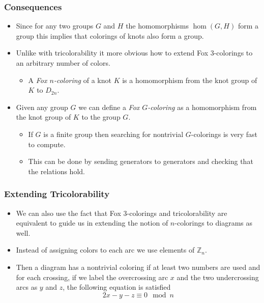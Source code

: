 \documentclass{beamer}
\begin{document}
\begin{frame}
  \frametitle{Consequences}
  \begin{itemize}
  \item Since for any two groups $G$ and $H$ the homomorphisms
    $\hom(G,H)$ form a group this implies that colorings of knots
    also form a group.
  \item Unlike with tricolorability it more obvious how to extend
    Fox $3$-colorings to an arbitrary number of colors.
    \begin{itemize}
    \item A \textit{Fox $n$-coloring} of a knot $K$ is a homomorphism from
      the knot group of $K$ to $D_{2n}$.
    \end{itemize}
  \item Given any group $G$ we can define a \textit{Fox $G$-coloring}
    as a homomorphism from the knot group of $K$ to the group $G$.
    \begin{itemize}
    \item If $G$ is a finite group then searching for nontrivial $G$-colorings
      is very fast to compute.
    \item This can be done by sending generators to generators and checking
      that the relations hold.
    \end{itemize}
  \end{itemize}
\end{frame}

\begin{frame}
  \frametitle{Extending Tricolorability}
  \begin{itemize}
  \item We can also use the fact that Fox $3$-colorings and tricolorability
    are equivalent to guide us in extending the notion of $n$-colorings
    to diagrams as well.
  \item Instead of assigning colors to each arc we use elements of $\mathbb{Z}_n$.
  \item Then a diagram has a nontrivial coloring if at least two numbers are used
    and for each crossing, if we label the overcrossing arc $x$ and the two
    undercrossing arcs as $y$ and $z$, the following equation is satisfied
    \[
      2x-y-z \equiv 0 \mod n
    \]
  \end{itemize}
\end{frame}
\end{document}
